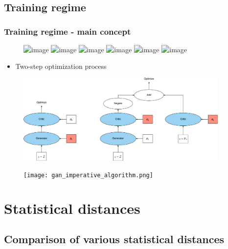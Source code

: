 \documentclass{Bredelebeamer}
\begin{document}
\subsection{Training regime}
\begin{frame}
	\frametitle{Training regime - main concept}
	\begin{figure}[h!]
	\centering
	\includegraphics<1>[width=\textwidth]{gan_optimization/GAN_optimization_1.png}
	\includegraphics<2>[width=\textwidth]{gan_optimization/GAN_optimization_2.png}
	\includegraphics<3>[width=\textwidth]{gan_optimization/GAN_optimization_3.png}
	\includegraphics<4>[width=\textwidth]{gan_optimization/GAN_optimization_4.png}
	\includegraphics<5>[width=\textwidth]{gan_optimization/GAN_optimization_5.png}
	\includegraphics<6->[width=\textwidth]{gan_optimization/GAN_optimization_6.png}
	\end{figure}
	\pause[6]
	\begin{itemize}
		\item Two-step optimization process
	\end{itemize}
\end{frame}
\begin{frame}
	\begin{figure}[h!]
	\centering
	\includegraphics[height=4.5cm]{gan_optimization_two_step.png}
\end{figure}
\begin{figure}[h!]
	\centering
	\texttt{[image: gan\_imperative\_algorithm.png]}
\end{figure}
\end{frame}


\section{Statistical distances}
\subsection{Comparison of various statistical distances}
\end{document}
